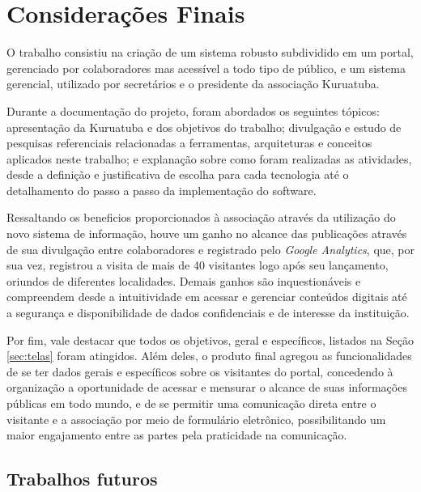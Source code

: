 \chapter{Considerações Finais}

O trabalho consistiu na criação de um sistema robusto subdividido em um portal, gerenciado por colaboradores mas acessível a todo tipo de público, e um sistema gerencial, utilizado por secretários e o presidente da associação Kuruatuba. 

Durante a documentação do projeto, foram abordados os seguintes tópicos: apresentação da Kuruatuba e dos objetivos do trabalho; divulgação e estudo de pesquisas referenciais relacionadas a ferramentas, arquiteturas e conceitos aplicados neste trabalho; e explanação sobre como foram realizadas as atividades, desde a definição e justificativa de escolha para cada tecnologia até o detalhamento do passo a passo da implementação do software.

Ressaltando os beneficios proporcionados à associação através da utilização do novo sistema de informação, houve um ganho no alcance das publicações através de sua divulgação entre colaboradores e registrado pelo \textit{Google Analytics}, que, por sua vez, registrou a visita de mais de 40 visitantes logo após seu lançamento, oriundos de diferentes localidades. Demais ganhos são inquestionáveis e compreendem desde a intuitividade em acessar e gerenciar conteúdos digitais até a segurança e disponibilidade de dados confidenciais e de interesse da instituição.  

Por fim, vale destacar que todos os objetivos, geral e específicos, listados na Seção \ref{sec:telas} foram atingidos. Além deles, o produto final agregou as funcionalidades de se ter dados gerais e específicos sobre os visitantes do portal, concedendo à organização a oportunidade de acessar e mensurar o alcance de suas informações públicas em todo mundo, e de se permitir uma comunicação direta entre o visitante e a associação por meio de formulário eletrônico, possibilitando um maior engajamento entre as partes pela praticidade na comunicação. 


\hspace{2.5cm}
\section{Trabalhos futuros}
\hspace{2.5cm}

